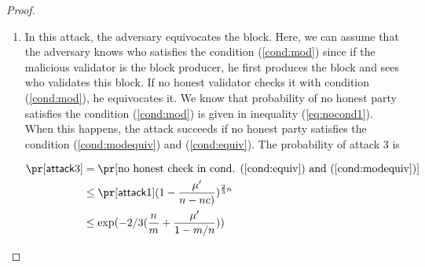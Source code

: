 \begin{proof}
\begin{enumerate}
    
    
    
    \item In this attack, the adversary equivocates the block. Here, we can assume that the adversary knows who satisfies the condition (\ref{cond:mod}) since if the malicious validator is the block producer, he first produces the block and sees who validates this block. If no honest validator checks it with condition (\ref{cond:mod}), he equivocates it.  We know that probability of no honest party satisfies the condition (\ref{cond:mod}) is given in  inequality (\ref{eq:nocond1}). When this happens, the attack succeeds if no honest party satisfies the condition (\ref{cond:modequiv}) and (\ref{cond:equiv}). 
    The probability of attack 3 is
    
    \begin{align}
    \pr[\mathsf{attack} 3] &=\pr[\text{no honest check in  cond. (\ref{cond:equiv}) and (\ref{cond:modequiv})}]\nonumber \\ 
							&\leq \pr[\mathsf{attack1}](1-\frac{\mu'}{n-nc)}) ^{\frac{2}{3}n} \nonumber\\
				            & \leq \exp({-2/3(\frac{n}{m}+\frac{\mu'}{1-m/n})}) \nonumber
    \end{align}
\end{enumerate}	
    
    

\end{proof}

